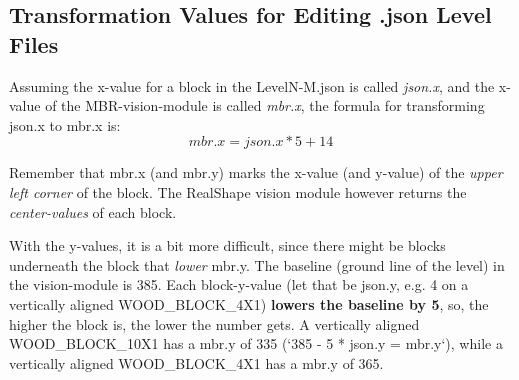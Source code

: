 \subsection{Transformation Values for Editing .json Level Files}

Assuming the x-value for a block in the LevelN-M.json is called \textit{json.x}, and the x-value of the MBR-vision-module is called \textit{mbr.x}, the formula for transforming json.x to mbr.x is: 
\[mbr.x = json.x * 5 + 14\]

Remember that mbr.x (and mbr.y) marks the x-value (and y-value) of the \textit{upper left corner} of the block. The RealShape vision module however returns the \textit{center-values} of each block. 

With the y-values, it is a bit more difficult, since there might be blocks underneath the block that \textit{lower} mbr.y. The baseline (ground line of the level) in the vision-module is 385. Each block-y-value (let that be json.y, e.g. 4 on a vertically aligned WOOD\_BLOCK\_4X1) \textbf{lowers the baseline by 5}, so, the higher the block is, the lower the number gets. A vertically aligned WOOD\_BLOCK\_10X1 has a mbr.y of 335 (`385 - 5 * json.y = mbr.y`), while a vertically aligned WOOD\_BLOCK\_4X1 has a mbr.y of 365.